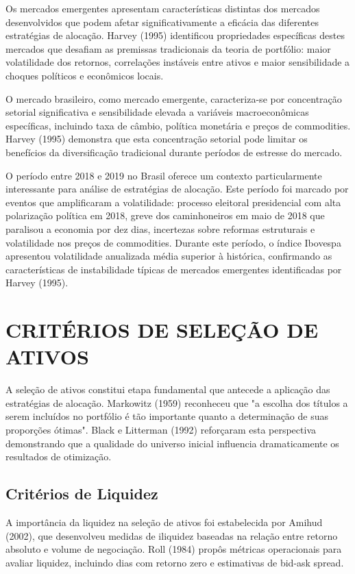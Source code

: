 Os mercados emergentes apresentam características distintas dos mercados desenvolvidos que podem afetar significativamente a eficácia das diferentes estratégias de alocação. Harvey (1995) identificou propriedades específicas destes mercados que desafiam as premissas tradicionais da teoria de portfólio: maior volatilidade dos retornos, correlações instáveis entre ativos e maior sensibilidade a choques políticos e econômicos locais.

O mercado brasileiro, como mercado emergente, caracteriza-se por concentração setorial significativa e sensibilidade elevada a variáveis macroeconômicas específicas, incluindo taxa de câmbio, política monetária e preços de commodities. Harvey (1995) demonstra que esta concentração setorial pode limitar os benefícios da diversificação tradicional durante períodos de estresse do mercado.

O período entre 2018 e 2019 no Brasil oferece um contexto particularmente interessante para análise de estratégias de alocação. Este período foi marcado por eventos que amplificaram a volatilidade: processo eleitoral presidencial com alta polarização política em 2018, greve dos caminhoneiros em maio de 2018 que paralisou a economia por dez dias, incertezas sobre reformas estruturais e volatilidade nos preços de commodities. Durante este período, o índice Ibovespa apresentou volatilidade anualizada média superior à histórica, confirmando as características de instabilidade típicas de mercados emergentes identificadas por Harvey (1995).

\section{CRITÉRIOS DE SELEÇÃO DE ATIVOS}

A seleção de ativos constitui etapa fundamental que antecede a aplicação das estratégias de alocação. Markowitz (1959) reconheceu que "a escolha dos títulos a serem incluídos no portfólio é tão importante quanto a determinação de suas proporções ótimas". Black e Litterman (1992) reforçaram esta perspectiva demonstrando que a qualidade do universo inicial influencia dramaticamente os resultados de otimização.

\subsection{Critérios de Liquidez}

A importância da liquidez na seleção de ativos foi estabelecida por Amihud (2002), que desenvolveu medidas de iliquidez baseadas na relação entre retorno absoluto e volume de negociação. Roll (1984) propôs métricas operacionais para avaliar liquidez, incluindo dias com retorno zero e estimativas de bid-ask spread.

